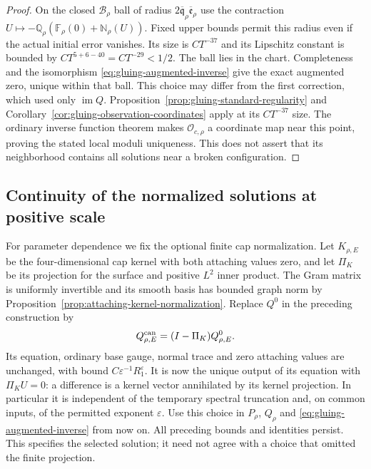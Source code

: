 \documentclass[11pt]{amsart}
\theoremstyle{definition}
\theoremstyle{remark}
\theoremstyle{plain}
\begin{document}
\begin{proof}
On the closed $\mathcal B_\rho$ ball of radius
$2\overline{\mathfrak q}_\rho\overline{\mathfrak e}_\rho$
use the contraction
$U\mapsto-\mathbb Q_\rho(\mathbb F_\rho(0)+\mathbb N_\rho(U))$.
Fixed upper bounds permit this radius even if the actual initial
error vanishes. Its size is $CT^{-37}$ and its Lipschitz
constant is bounded by $CT^{5+6-40}=CT^{-29}<1/2$.
The ball lies in the chart. Completeness and the isomorphism
\eqref{eq:gluing-augmented-inverse} give the exact augmented zero,
unique within that ball. This choice may differ from the first
correction, which used only $\operatorname{im}Q$.
Proposition~\ref{prop:gluing-standard-regularity} and
Corollary~\ref{cor:gluing-observation-coordinates} apply at its
$CT^{-37}$ size. The ordinary inverse function theorem makes
$\mathcal O_{c,\rho}$ a coordinate map near this point, proving
the stated local moduli uniqueness. This does not assert that its
neighborhood contains all solutions near a broken configuration.
\end{proof}

\subsection{Continuity of the normalized solutions at positive scale}

For parameter dependence we fix the optional finite cap normalization.
Let $K_{\rho,E}$ be the four-dimensional cap kernel with both
attaching values zero, and let $\Pi_K$ be its projection for
the surface and positive $L^2$ inner product. The Gram matrix
is uniformly invertible and its smooth basis has bounded graph norm
by Proposition~\ref{prop:attaching-kernel-normalization}. Replace
$Q^0$ in the preceding construction by
\begin{equation}\label{eq:gluing-canonical-cap-inverse}
                            Q^{\rm can}_{\rho,E}=(I-\Pi_K)Q^0_{\rho,E}.
\end{equation}
Its equation, ordinary base gauge, normal trace and zero attaching
values are unchanged, with bound $C\varepsilon^{-1}R_1^\varepsilon$.
It is now the unique output of its equation with $\Pi_KU=0$:
a difference is a kernel vector annihilated by its kernel projection.
In particular it is independent of the temporary spectral truncation
and, on common inputs, of the permitted exponent $\varepsilon$.
Use this choice in $P_\rho$, $Q_\rho$ and
\eqref{eq:gluing-augmented-inverse} from now on. All preceding
bounds and identities persist. This specifies the selected solution;
it need not agree with a choice that omitted the finite projection.
\end{document}
